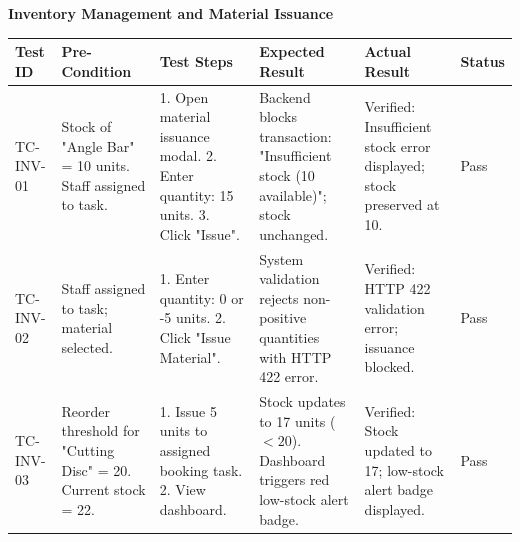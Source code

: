 \documentclass[12pt, letterpaper]{article}
\begin{document}
\begin{landscape}


\begin{center}\textbf{Inventory Management and Material Issuance}\end{center}
\centering

\begin{tabular}{p{2.2cm} p{3.8cm} p{5cm} p{5cm} p{3.5cm} p{1.5cm}}
\toprule
\textbf{Test ID} & \textbf{Pre-Condition} & \textbf{Test Steps} & \textbf{Expected Result} & \textbf{Actual Result} & \textbf{Status} \\
\midrule
TC-INV-01 & Stock of "Angle Bar" = 10 units. Staff assigned to task. & 1. Open material issuance modal. 2. Enter quantity: 15 units. 3. Click "Issue". & Backend blocks transaction: "Insufficient stock (10 available)"; stock unchanged. & Verified: Insufficient stock error displayed; stock preserved at 10. & Pass \\
TC-INV-02 & Staff assigned to task; material selected. & 1. Enter quantity: 0 or -5 units. 2. Click "Issue Material". & System validation rejects non-positive quantities with HTTP 422 error. & Verified: HTTP 422 validation error; issuance blocked. & Pass \\
TC-INV-03 & Reorder threshold for "Cutting Disc" = 20. Current stock = 22. & 1. Issue 5 units to assigned booking task. 2. View dashboard. & Stock updates to 17 units ($<20$). Dashboard triggers red low-stock alert badge. & Verified: Stock updated to 17; low-stock alert badge displayed. & Pass \\
\bottomrule
\end{tabular}

    
\end{landscape}

\clearpage

\newpage
\end{document}
